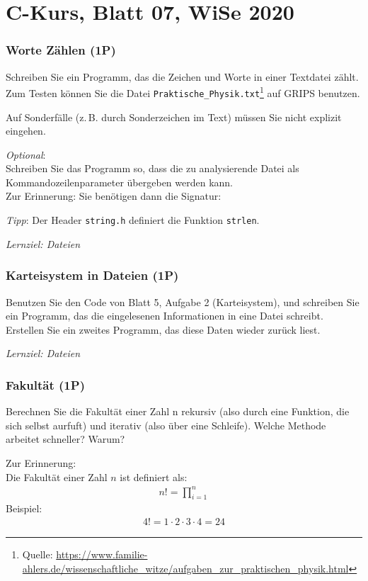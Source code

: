 \documentclass[
	ngerman,
	fontsize=10pt,
	parskip=half,
	titlepage=true,
	DIV=12
]{scrartcl}
\begin{document}
\part*{C-Kurs, Blatt 07, WiSe 2020}

\section{Worte Zählen (1P)}
Schreiben Sie ein Programm, das die Zeichen  und Worte in einer Textdatei zählt. Zum Testen können Sie die Datei \texttt{Praktische\_Physik.txt}\footnote{Quelle: \url{https://www.familie-ahlers.de/wissenschaftliche_witze/aufgaben_zur_praktischen_physik.html}} auf GRIPS benutzen.

Auf Sonderfälle (z.\,B. durch Sonderzeichen im Text) müssen Sie nicht explizit eingehen.

\emph{Optional}:\\
Schreiben Sie das Programm so, dass die zu analysierende Datei als Kommandozeilenparameter übergeben werden kann.\\
Zur Erinnerung: Sie benötigen dann die Signatur:

\emph{Tipp}: 
Der Header \texttt{string.h} definiert die Funktion \texttt{strlen}.

\emph{Lernziel: Dateien}

\section{Karteisystem in Dateien (1P)}
Benutzen Sie den Code von Blatt 5, Aufgabe 2 (Karteisystem), und schreiben Sie ein Programm, das die eingelesenen Informationen in eine Datei schreibt. Erstellen Sie ein zweites Programm, das diese Daten wieder zurück liest.

\emph{Lernziel: Dateien}

\section{Fakultät (1P)}
Berechnen Sie die Fakultät einer Zahl n rekursiv (also durch eine Funktion, die sich selbst aurfuft) und iterativ (also über eine Schleife). Welche Methode arbeitet schneller? Warum?

Zur Erinnerung:\\
Die Fakultät einer Zahl $n$ ist definiert als:
\begin{align*}
	n! = \prod_{i=1}^{n}
\end{align*}
Beispiel:
\begin{align*}
	4! = 1 \cdot 2 \cdot 3  \cdot 4 = 24
\end{align*}
\end{document}
